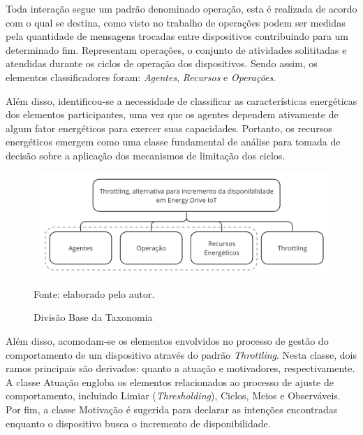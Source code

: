 Toda interação segue um padrão denominado operação, esta é realizada de acordo com o qual se destina, como visto no trabalho de \cite{khairnar_discrete-rate_2015} operações podem ser medidas pela quantidade de mensagens trocadas entre dispositivos contribuindo para um determinado fim. Representam operações, o conjunto de atividades solititadas e atendidas durante os ciclos de operação dos dispositivos. Sendo assim, os elementos classificadores foram: \textit{Agentes}, \textit{Recursos} e \textit{Operações}.

Além disso, identificou-se a necessidade de classificar as características energéticas dos elementos participantes, uma vez que os agentes dependem ativamente de algum fator energéticos para exercer suas capacidades. Portanto, os recursos energéticos emergem como uma classe fundamental de análise para tomada de decisão sobre a aplicação dos mecanismos de limitação dos ciclos.


\begin{figure}[hbt]
	\centering
	\caption{Divisão Base da Taxonomia}
	\label{fig:cap4divisaobasetaxonomia}
	\includegraphics[width=0.7\linewidth]{Imagens/cap4/cap4taxonomia_primeironivel.jpg}	
	
	Fonte: elaborado pelo autor.
\end{figure}

Além disso, acomodam-se os elementos envolvidos no processo de gestão do comportamento de um dispositivo através do padrão \textit{Throttling}. Nesta classe, dois ramos principais são derivados: quanto a atuação e motivadores, respectivamente. A classe Atuação engloba os elementos relacionados ao processo de ajuste de comportamento, incluindo Limiar (\textit{Thresholding}), Ciclos, Meios e Observáveis. Por fim, a classe Motivação é sugerida para declarar as intenções encontradas enquanto o dispositivo busca o incremento de disponibilidade. 

